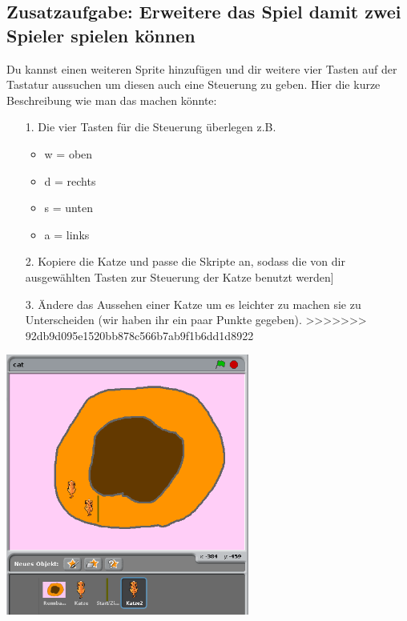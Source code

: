 \subsection{Zusatzaufgabe: Erweitere das Spiel damit zwei Spieler spielen können}
Du kannst einen weiteren Sprite hinzufügen und dir weitere vier Tasten auf der Tastatur aussuchen um diesen auch eine Steuerung zu geben. Hier die kurze Beschreibung wie man das machen könnte:
\begin{itemize}
\item[1. ] Die vier Tasten für die Steuerung überlegen z.B.
  \begin{itemize}
  \item w = oben
  \item d = rechts
  \item s = unten
  \item a = links
\end{itemize}
\item[2. ] Kopiere die Katze und passe die Skripte an, sodass die von dir ausgewählten Tasten zur Steuerung der Katze benutzt werden]
  \item[3. ] Ändere das Aussehen einer Katze um es leichter zu machen sie zu Unterscheiden (wir haben ihr ein paar Punkte gegeben).
>>>>>>> 92db9d095e1520bb878c566b7ab9f1b6dd1d8922
\end{itemize}
\includegraphics[width=0.6\textwidth]{images/aufgabe4_multiplayer.png}
